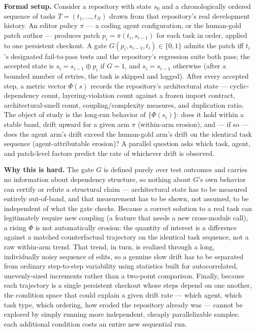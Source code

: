 \documentclass[11pt]{article}
\begin{document}
\noindent\textbf{Formal setup.} Consider a repository with state $s_0$ and a chronologically ordered sequence of tasks $T = (t_1,\dots,t_N)$ drawn from that repository's real development history. An editor policy $\pi$ --- a coding agent configuration, or the human-gold patch author --- produces patch $p_i = \pi(t_i, s_{i-1})$ for each task in order, applied to one persistent checkout. A gate $G(p_i, s_{i-1}, t_i) \in \{0,1\}$ admits the patch iff $t_i$'s designated fail-to-pass tests and the repository's regression suite both pass; the accepted state is $s_i = s_{i-1} \oplus p_i$ if $G=1$, and $s_i = s_{i-1}$ otherwise (after a bounded number of retries, the task is skipped and logged). After every accepted step, a metric vector $\Phi(s)$ records the repository's architectural state --- cyclic-dependency count, layering-violation count against a frozen import contract, architectural-smell count, coupling/complexity measures, and duplication ratio. The object of study is the long-run behavior of $\{\Phi(s_i)\}$: does it hold within a stable band, drift upward for a given arm $\pi$ (within-arm erosion), and --- if so --- does the agent arm's drift exceed the human-gold arm's drift on the identical task sequence (agent-attributable erosion)? A parallel question asks which task, agent, and patch-level factors predict the rate of whichever drift is observed.

\noindent\textbf{Why this is hard.} The gate $G$ is defined purely over test outcomes and carries no information about dependency structure, so nothing about $G$'s own behavior can certify or refute a structural claim --- architectural state has to be measured entirely out-of-band, and that measurement has to be shown, not assumed, to be independent of what the gate checks. Because a correct solution to a real task can legitimately require new coupling (a feature that needs a new cross-module call), a rising $\Phi$ is not automatically erosion: the quantity of interest is a difference against a matched counterfactual trajectory on the identical task sequence, not a raw within-arm trend. That trend, in turn, is realized through a long, individually noisy sequence of edits, so a genuine slow drift has to be separated from ordinary step-to-step variability using statistics built for autocorrelated, unevenly-sized increments rather than a two-point comparison. Finally, because each trajectory is a single persistent checkout whose steps depend on one another, the condition space that could explain a given drift rate --- which agent, which task type, which ordering, how eroded the repository already was --- cannot be explored by simply running more independent, cheaply parallelizable samples; each additional condition costs an entire new sequential run.
\end{document}

